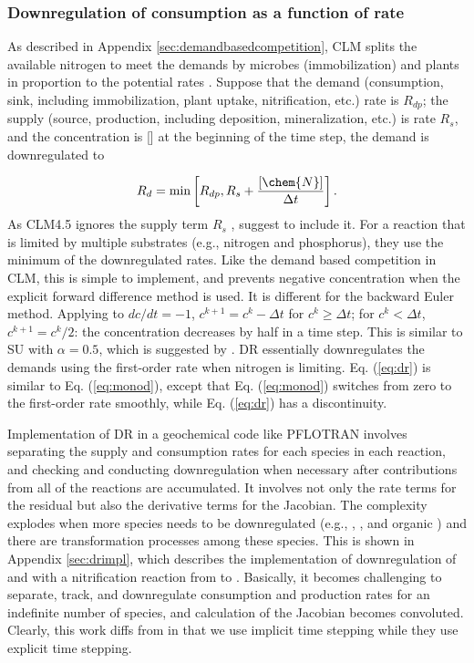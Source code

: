 \documentclass[gmd, manuscript]{copernicus}
\begin{document}
\subsubsection{Downregulation of consumption as a function of rate}
As described in Appendix \ref{sec:demandbasedcompetition}, CLM splits the
available nitrogen to meet the demands by microbes (immobilization) and plants in
proportion to the potential rates \citep{Thornton2005}. Suppose that the
demand (consumption, sink, including immobilization, plant uptake,
nitrification, etc.) rate is $R_{dp}$; the supply (source, production,
including deposition, mineralization, etc.) is rate $R_s$, and the
concentration is [] at the beginning of the time step, the demand is
downregulated to

\begin{equation}
R_d=\text{min}\left[R_{dp}, R_s + \frac{[\chem{N}]}{\Delta t}\right].	
\label{eq:dr}
\end{equation}
As CLM4.5 ignores the supply term $R_s$ \citep{Oleson2013}, \citet{Tang2015}
suggest to include it. For a reaction that is limited by multiple substrates
(e.g., nitrogen and phosphorus), they use the minimum of the downregulated
rates. Like the demand based competition in CLM, this is simple to implement,
and prevents negative concentration when the explicit forward difference method
is used.  
It is different for the backward Euler method. 
Applying to $dc/dt=-1$, $c^{k+1}=c^k-\Delta t$ for $c^k \geq \Delta t$; for
$c^k < \Delta t$, $c^{k+1} = c^k/2$: the concentration decreases by half in a
time step. This is similar to SU with $\alpha=0.5$, which is suggested by
\citet{Bethke2007}. DR essentially downregulates the demands using the
first-order rate when nitrogen is limiting. Eq. (\ref{eq:dr}) is similar
to Eq. (\ref{eq:monod}), except that Eq. (\ref{eq:monod}) switches from zero to
the first-order rate smoothly, while Eq. (\ref{eq:dr}) has a discontinuity. 

Implementation of DR in a geochemical code like PFLOTRAN involves separating
the supply and consumption rates for each species in each reaction, and
checking and conducting downregulation when necessary after contributions from
all of the reactions are accumulated. It involves not only the rate terms for
the residual but also the derivative terms for the Jacobian. The complexity
explodes when more species needs to be downregulated (e.g., ,
, and organic ) and there are transformation processes
among these species. This is shown in Appendix \ref{sec:drimpl}, which describes the
implementation of downregulation of  and  with a
nitrification reaction from  to . Basically, it
becomes challenging to separate, track, and downregulate consumption and
production rates for an indefinite number of species, and calculation of the
Jacobian becomes convoluted. Clearly, this work diffs from \citet{Tang2015} in
that we use implicit time stepping while they use explicit
time stepping.
\end{document}
